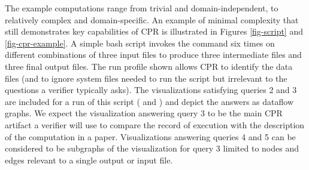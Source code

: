 \vspace*{-1em}

The example computations range from trivial and domain-independent, to relatively complex and domain-specific. An example of minimal complexity that still demonstrates key capabilities of CPR is illustrated in Figures \ref{fig-script} and \ref{fig-cpr-example}. A simple bash script invokes the  command six times on different combinations of three input files to produce three intermediate files and three final output files. The run profile shown allows CPR to identify the data files (and to ignore system files needed to run the script but irrelevant to the questions a verifier typically asks).  The visualizations satisfying queries 2 and 3 are included for a run of this script ( and ) and depict the answers as dataflow graphs. We expect the visualization answering query 3 to be the main CPR artifact a verifier will use to compare the record of execution with the description of the computation in a paper. Visualizations answering queries 4 and 5 can be considered to be subgraphs of the visualization for query 3 limited to nodes and edges relevant to a single output or input file.
 
